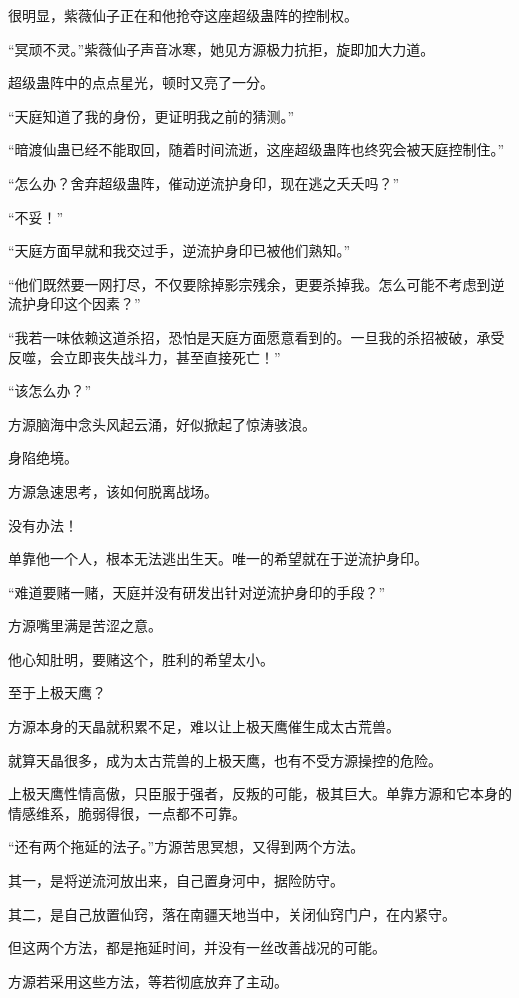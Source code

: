 \begin{this_body}
很明显，紫薇仙子正在和他抢夺这座超级蛊阵的控制权。

“冥顽不灵。”紫薇仙子声音冰寒，她见方源极力抗拒，旋即加大力道。

超级蛊阵中的点点星光，顿时又亮了一分。

“天庭知道了我的身份，更证明我之前的猜测。”

“暗渡仙蛊已经不能取回，随着时间流逝，这座超级蛊阵也终究会被天庭控制住。”

“怎么办？舍弃超级蛊阵，催动逆流护身印，现在逃之夭夭吗？”

“不妥！”

“天庭方面早就和我交过手，逆流护身印已被他们熟知。”

“他们既然要一网打尽，不仅要除掉影宗残余，更要杀掉我。怎么可能不考虑到逆流护身印这个因素？”

“我若一味依赖这道杀招，恐怕是天庭方面愿意看到的。一旦我的杀招被破，承受反噬，会立即丧失战斗力，甚至直接死亡！”

“该怎么办？”

方源脑海中念头风起云涌，好似掀起了惊涛骇浪。

身陷绝境。

方源急速思考，该如何脱离战场。

没有办法！

单靠他一个人，根本无法逃出生天。唯一的希望就在于逆流护身印。

“难道要赌一赌，天庭并没有研发出针对逆流护身印的手段？”

方源嘴里满是苦涩之意。

他心知肚明，要赌这个，胜利的希望太小。

至于上极天鹰？

方源本身的天晶就积累不足，难以让上极天鹰催生成太古荒兽。

就算天晶很多，成为太古荒兽的上极天鹰，也有不受方源操控的危险。

上极天鹰性情高傲，只臣服于强者，反叛的可能，极其巨大。单靠方源和它本身的情感维系，脆弱得很，一点都不可靠。

“还有两个拖延的法子。”方源苦思冥想，又得到两个方法。

其一，是将逆流河放出来，自己置身河中，据险防守。

其二，是自己放置仙窍，落在南疆天地当中，关闭仙窍门户，在内紧守。

但这两个方法，都是拖延时间，并没有一丝改善战况的可能。

方源若采用这些方法，等若彻底放弃了主动。


\end{this_body}
